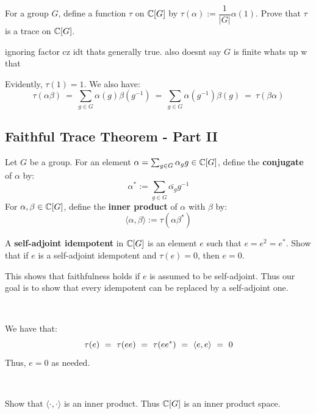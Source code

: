 \begin{exr}
	For a group $G$, define a function $\tau$ on $\mathbb{C}[G]$ by $\tau(\alpha):=\dfrac{1}{|G|}\alpha(1)$.
	Prove that $\tau$ is a trace on $\mathbb{C}[G]$.
\end{exr}
ignoring factor cz idt thats generally true.
also doesnt say $G$ is finite whats up w that

\begin{pf}
	Evidently, $\tau(1)=1$. We also have:
	\begin{equation*}
		\tau(\alpha\beta) \ = \ \sum_{g\in G}\alpha(g)\beta(g^{-1})
		\ = \ \sum_{g\in G}\alpha(g^{-1})\beta(g) \ = \ \tau(\beta\alpha)
	\end{equation*}
\end{pf}


\newpage
\subsection{Faithful Trace Theorem - Part II}
Let $G$ be a group.
For an element  $\alpha=\sum_{g\in G}\alpha_gg\in\mathbb{C}[G]$,
define the \textbf{conjugate} of $\alpha$ by:
\begin{equation*}
	\alpha^* := \sum_{g\in G} \bar{\alpha_g}g^{-1}
\end{equation*}
For $\alpha,\beta\in \mathbb{C}[G]$, define the \textbf{inner product} of $\alpha$ with $\beta$ by:
\begin{equation*}
	\langle \alpha,\beta\rangle := \tau(\alpha\beta^*)
\end{equation*}

\begin{exr}
	A \textbf{self-adjoint idempotent} in $\mathbb{C}[G]$ is an element $e$ such that $e=e^2=e^*$.
	Show that if $e$ is a self-adjoint idempotent and $\tau(e)=0$, then $e=0$.

	This shows that faithfulness holds if $e$ is assumed to be self-adjoint.
	Thus our goal is to show that every idempotent can be replaced by a self-adjoint one.
\end{exr} \

\begin{pf}
	We have that:
	\begin{equation*}
		\tau(e) \ = \ \tau(ee) \ = \ \tau(ee^{*}) \ = \ \left\langle{e,e}\right\rangle \ = \ 0
	\end{equation*}
	Thus, $e=0$ as needed.
\end{pf} \

\begin{exr}
	Show that $\langle\cdot,\cdot\rangle$ is an inner product.
	Thus $\mathbb{C}[G]$ is an inner product space.
\end{exr} \

